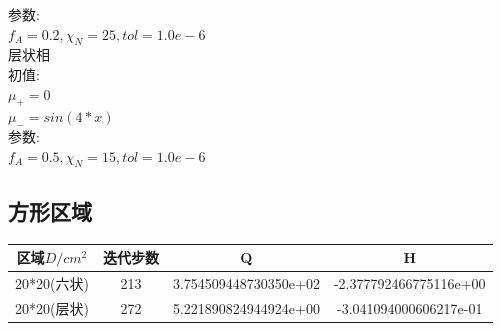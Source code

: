 \documentclass[12pt]{article}
\begin{document}
\begin{CJK}{UTF8}{gkai}
    参数:\\
    
     $f_A=0.2,\chi_N=25,tol=1.0e-6$\\
     
     层状相\\
     
     初值:\\
    
    $ \mu_+=0 $\\
    
    $ \mu_-=sin(4*x)$\\

    参数:\\
    
     $f_A=0.5,\chi_N=15,tol=1.0e-6$\\
     \subsection{方形区域}
   
     \begin{table}[H]
     	\centering
     	    \begin{tabular}{cccc}
     	    	
     	    	\toprule
     	    	区域$D/cm^2$&迭代步数 & Q &  H \\
     	    	\midrule    20*20(六状)&213&3.754509448730350e+02&-2.377792466775116e+00\\
     	    	20*20(层状)&272& 5.221890824944924e+00 &-3.041094000606217e-01\\
     	    	\bottomrule
     	    \end{tabular}
     \end{table} 


\end{CJK}
\end{document}
